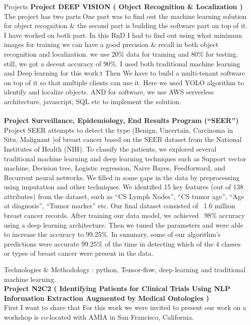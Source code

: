 \documentclass{resume} %
\begin{document}
\begin{rSection}{Projects}
{\bf Project DEEP VISION ( Object Recognition \& Localization )}
\\The project has two parts.One part was to find out the machine learning solution for object recognition \& the second part is building the software part on top of it. I have worked on both part. In this RnD I had to find out using what minimum images for training we can have a good precision \& recall in both object recognition and localization. we use 20\% data for training and 80\% for testing. still, we got a decent accuracy of 90\%. I used both traditional machine learning and Deep learning for this work.t Then We have to build a multi-tenant software on top of it so that multiple clients can use it. Here we used YOLO algorithm to identify and localize objects. AND for software, we use AWS serverless architecture, javascript, SQL etc to implement the solution.\\
\\{\bf Project Surveillance, Epidemiology, End Results Program (“SEER”)}\\
Project SEER attempts to detect the type (Benign, Uncertain, Carcinoma in Situ, Malignant )of breast cancer based on the SEER dataset from the National Institutes of Health (NIH). To classify the patients, we explored several traditional machine learning and deep learning techniques such as Support vector machine, Decision tree, Logistic regression, Naive Bayes, Feedforward, and Recurrent neural networks. We filled in some gaps in the data by preprocessing using imputation and other techniques. We identified 15 key features (out of 138 attributes) from the dataset, such as “CS Lymph Nodes”, “CS tumor age”, “Age at diagnosis”, “Tumor marker” etc. Our final dataset consisted of ~1.6 million breast cancer records. After training our data model, we achieved ~98\% accuracy using a deep learning architecture. Then we tuned the parameters and were able to increase the accuracy to 99.25\%. In summary, some of our algorithm’s predictions were accurate 99.25\% of the time in detecting which of the 4 classes or types of breast cancer were present in the data.

\item Technologies \& Methodology : 
python, Tensor-flow, deep learning and traditional machine learning.\\


{\bf Project N2C2 ( Identifying Patients for Clinical Trials Using NLP Information Extraction Augmented by Medical Ontologies )
}\\
First I want to share that For this work we were invited to present our work on a workshop is co-located with AMIA in San Francisco, California. 


\end{rSection}
\end{document}
